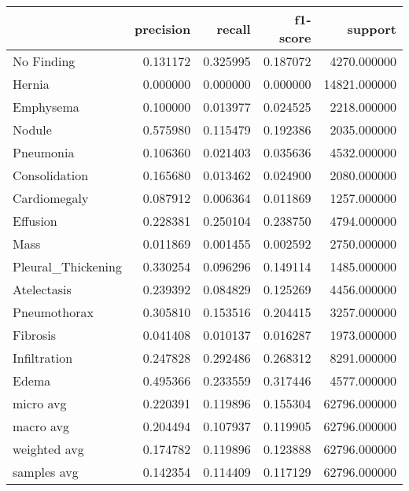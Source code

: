 \begin{tabular}{lrrrr}
\toprule
 & precision & recall & f1-score & support \\
\midrule
No Finding & 0.131172 & 0.325995 & 0.187072 & 4270.000000 \\
Hernia & 0.000000 & 0.000000 & 0.000000 & 14821.000000 \\
Emphysema & 0.100000 & 0.013977 & 0.024525 & 2218.000000 \\
Nodule & 0.575980 & 0.115479 & 0.192386 & 2035.000000 \\
Pneumonia & 0.106360 & 0.021403 & 0.035636 & 4532.000000 \\
Consolidation & 0.165680 & 0.013462 & 0.024900 & 2080.000000 \\
Cardiomegaly & 0.087912 & 0.006364 & 0.011869 & 1257.000000 \\
Effusion & 0.228381 & 0.250104 & 0.238750 & 4794.000000 \\
Mass & 0.011869 & 0.001455 & 0.002592 & 2750.000000 \\
Pleural_Thickening & 0.330254 & 0.096296 & 0.149114 & 1485.000000 \\
Atelectasis & 0.239392 & 0.084829 & 0.125269 & 4456.000000 \\
Pneumothorax & 0.305810 & 0.153516 & 0.204415 & 3257.000000 \\
Fibrosis & 0.041408 & 0.010137 & 0.016287 & 1973.000000 \\
Infiltration & 0.247828 & 0.292486 & 0.268312 & 8291.000000 \\
Edema & 0.495366 & 0.233559 & 0.317446 & 4577.000000 \\
micro avg & 0.220391 & 0.119896 & 0.155304 & 62796.000000 \\
macro avg & 0.204494 & 0.107937 & 0.119905 & 62796.000000 \\
weighted avg & 0.174782 & 0.119896 & 0.123888 & 62796.000000 \\
samples avg & 0.142354 & 0.114409 & 0.117129 & 62796.000000 \\
\bottomrule
\end{tabular}
